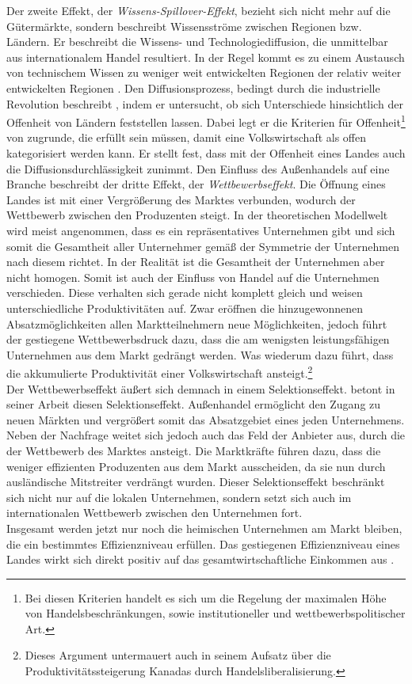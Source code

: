 %
Der zweite Effekt, der \textit{Wissens-Spillover-Effekt}, bezieht sich nicht mehr auf die Gütermärkte, sondern beschreibt Wissensströme zwischen Regionen bzw. Ländern. Er beschreibt die Wissens- und Technologiediffusion, die unmittelbar aus internationalem Handel resultiert. In der Regel kommt es zu einem Austausch von technischem Wissen zu weniger weit entwickelten Regionen der relativ weiter entwickelten Regionen \cite{Sachs.1995}. 
Den Diffusionsprozess, bedingt durch die industrielle Revolution beschreibt \cite{Lucas.2007}, indem er untersucht, ob sich Unterschiede hinsichtlich der Offenheit von Ländern feststellen lassen. Dabei legt er die Kriterien für Offenheit\footnote{Bei diesen Kriterien handelt es sich um die Regelung der maximalen Höhe von Handelsbeschränkungen, sowie institutioneller und wettbewerbspolitischer Art.} von \cite{Sachs.1995} zugrunde, die erfüllt sein müssen, damit eine Volkswirtschaft als offen kategorisiert werden kann. Er stellt fest, dass mit der Offenheit eines Landes auch die Diffusionsdurchlässigkeit zunimmt.
%
Den Einfluss des Außenhandels auf eine Branche beschreibt der dritte Effekt, der \textit{Wettbewerbseffekt}. Die Öffnung eines Landes ist mit einer Vergrößerung des Marktes verbunden, wodurch der Wettbewerb zwischen den Produzenten steigt. In der theoretischen Modellwelt wird meist angenommen, dass es ein repräsentatives Unternehmen gibt und sich somit die Gesamtheit aller Unternehmer gemäß der Symmetrie der Unternehmen nach diesem richtet. In der Realität ist die Gesamtheit der Unternehmen aber nicht homogen. Somit ist auch der Einfluss von Handel auf die Unternehmen verschieden. Diese verhalten sich gerade nicht komplett gleich und weisen unterschiedliche Produktivitäten auf. Zwar eröffnen die hinzugewonnenen Absatzmöglichkeiten allen Marktteilnehmern neue Möglichkeiten, jedoch führt der gestiegene Wettbewerbsdruck dazu, dass die am wenigsten leistungsfähigen Unternehmen aus dem Markt gedrängt werden. Was wiederum dazu führt, dass die akkumulierte Produktivität einer Volkswirtschaft ansteigt.\footnote{Dieses Argument untermauert auch \cite{Trefler.2004} in seinem Aufsatz über die Produktivitätssteigerung Kanadas durch Handelsliberalisierung.}\\
%
Der Wettbewerbseffekt äußert sich demnach in einem Selektionseffekt. \cite{Melitz.2003} betont in seiner Arbeit diesen Selektionseffekt. Außenhandel ermöglicht den Zugang zu neuen Märkten und vergrößert somit das Absatzgebiet eines jeden Unternehmens. Neben der Nachfrage weitet sich jedoch auch das Feld der Anbieter aus, durch die der Wettbewerb des Marktes ansteigt. Die Marktkräfte führen dazu, dass die weniger effizienten Produzenten aus dem Markt ausscheiden, da sie nun durch ausländische Mitstreiter verdrängt wurden. Dieser Selektionseffekt beschränkt sich nicht nur auf die lokalen Unternehmen, sondern setzt sich auch im internationalen Wettbewerb zwischen den Unternehmen fort.\\Insgesamt werden jetzt nur noch die heimischen Unternehmen am Markt bleiben, die ein bestimmtes Effizienzniveau erfüllen. Das gestiegenen Effizienzniveau eines Landes wirkt sich direkt positiv auf das gesamtwirtschaftliche Einkommen aus \cite[Kapitel 15]{Aghion.2015}.
%
